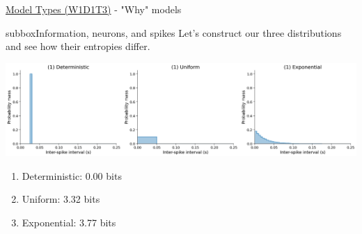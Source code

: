 \begin{textbox}{\href{https://compneuro.neuromatch.io/tutorials/W1D1_ModelTypes/student/W1D1_Tutorial3.html}{Model Types (W1D1T3)} -  "Why" models}
\begin{subbox}{subbox}{Information, neurons, and spikes}
Let's construct our three distributions and see how their entropies differ.

\begin{center}
    
\includegraphics[scale=0.14]{Figures/MT/MT_Figure8.png}
\end{center}


\begin{enumerate}
\item Deterministic: 0.00 bits
\item Uniform: 3.32 bits
\item Exponential: 3.77 bits
\end{enumerate}
\end{subbox}

\end{textbox}
